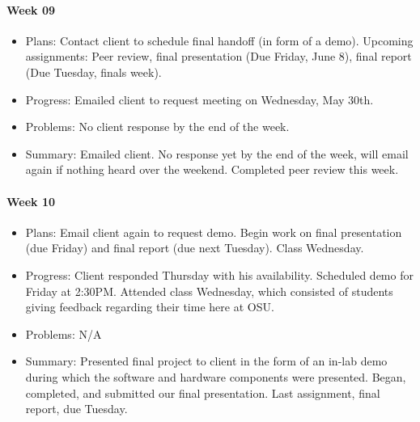 \paragraph{Week 09}
\begin{itemize}
\item Plans: Contact client to schedule final handoff (in form of a demo).
Upcoming assignments: Peer review, final presentation (Due Friday, June 8), final report (Due Tuesday, finals week).
\item Progress: Emailed client to request meeting on Wednesday, May 30th.
\item Problems: No client response by the end of the week.
\item Summary: Emailed client. 
No response yet by the end of the week, will email again if nothing heard over the weekend. 
Completed peer review this week.
\end{itemize}
\paragraph{Week 10}
\begin{itemize}
\item Plans: Email client again to request demo.
Begin work on final presentation (due Friday) and final report (due next Tuesday).
Class Wednesday.
\item Progress: Client responded Thursday with his availability. 
Scheduled demo for Friday at 2:30PM.
Attended class Wednesday, which consisted of students giving feedback regarding their time here at OSU.
\item Problems: N/A
\item Summary: Presented final project to client in the form of an in-lab demo during which the software and hardware components were presented.
Began, completed, and submitted our final presentation.
Last assignment, final report, due Tuesday.
\end{itemize}